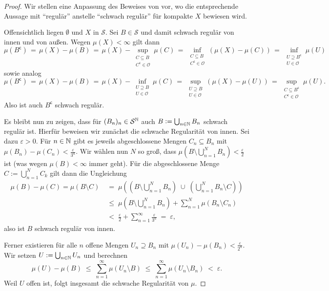 \documentclass[../main/main.tex]{subfiles}
\begin{document}
	\begin{proof}
		Wir stellen eine Anpassung des Beweises von 
		\cite[Lemma 4.5.5]{Simon.2015} vor, wo die entsprechende Aussage mit \enquote{regulär} 
		anstelle \enquote{schwach regulär} für kompakte $X$ bewiesen wird.
		
		Offensichtlich liegen $\emptyset$ und $X$ in $\mathcal{S}$. Sei 
		$B \in \mathcal{S}$ und damit schwach regulär 
		von innen und von außen. Wegen $\mu(X) < \infty$ gilt dann
		$$\mu(B^\mathsf{c}) 
		\, = \, \mu(X) - \mu(B) 
		\, = \, \mu(X) - \sup_{\substack{C \subseteq B \\ C^\mathsf{c} \in \mathcal{O}}} \mu(C) 
		\, = \, \inf_{\substack{C \subseteq B \\ C^\mathsf{c} \in \mathcal{O}}} (\mu(X) - \mu(C))
		\, = \, \inf_{\substack{U \supseteq B^\mathsf{c} \\ U \in \mathcal{O}}} \mu(U)$$
		sowie analog
		$$\mu(B^\mathsf{c}) 
		\, = \, \mu(X) - \mu(B) 
		\, = \, \mu(X) - \inf_{\substack{U \supseteq B \\ U \in \mathcal{O}}} \mu(C)
		\, = \, \sup_{\substack{U \supseteq B \\ U \in \mathcal{O}}} (\mu(X) - \mu(U))
		\, = \, \sup_{\substack{C \subseteq B^\mathsf{c} \\ C^\mathsf{c} \in 
				\mathcal{O}}} \mu(U) \text{.}$$
		Also ist auch $B^\mathsf{c}$ schwach regulär. 
		
		Es bleibt nun zu zeigen, dass für $(B_n)_n \in \mathcal{S}^{\mathbb{N}}$ auch $B \vcentcolon = 
		\bigcup_{n \in \mathbb{N}} B_n$ schwach regulär ist. 
		Hierfür beweisen wir zunächst die schwache Regularität von innen. 
		Sei dazu $\varepsilon > 0$. Für $n \in \mathbb{N}$ gibt es jeweils abgeschlossene Mengen 
		$C_n \subseteq B_n$ mit $\mu(B_n) - \mu(C_n) < \frac{\varepsilon}{3^n}$.
		Wir wählen nun $N$ so groß, dass $\mu\left( B \setminus \bigcup_{n=1}^N B_n \right) 
		< \frac{\varepsilon}{2}$ ist (was wegen $\mu(B) < \infty$ immer geht). 
		Für die abgeschlossene Menge $C := \bigcup_{n=1}^N C_k$ gilt dann die Ungleichung 
		\begin{align*}
			\mu(B) - \mu(C) = \mu(B\setminus C) \; &=
			\; \mu\left( \left( B \setminus \bigcup_{n=1}^N B_n \right) \; \cup \; 
			\left( \bigcup_{n=1}^N B_n  \setminus C \right) \right) \\
			&\leq \; \mu \left( B \setminus \bigcup_{n=1}^N B_n \right) + 
			\sum_{n=1}^{N} \mu(B_n \setminus C_n) \\
			&<    \; \frac{\varepsilon}{2} + 
			\sum_{n=1}^{\infty} \frac{\varepsilon}{3^n} \; = \; \varepsilon \text{,}
		\end{align*}
		also ist $B$ schwach regulär von innen.
		
		Ferner existieren für alle $n$ offene Mengen $U_n \supseteq B_n$ 
		mit $\mu(U_n) - \mu(B_n) < \frac{\varepsilon}{2^n}$. Wir setzen 
		$U := \bigcup_{n \in \mathbb{N}} U_n$ und berechnen  
		$$\mu(U) - \mu(B) \; \leq \; \sum_{n=1}^\infty \mu(U_n \setminus B) \; \leq \; 
		\sum_{n=1}^\infty \mu(U_n \setminus B_n) \; < \; \varepsilon \text{.}$$
		Weil $U$ offen ist, folgt insgesamt die schwache Regularität von $\mu$.
	\end{proof}
	
\end{document}
